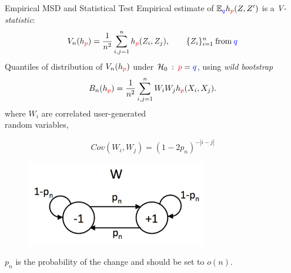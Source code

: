 \begin{frame}
\begin{columns}
\begin{column}{.33\linewidth}
\vspace{-0.75cm}
\begin{block}{Empirical MSD and Statistical Test}
Empirical estimate  of $\mathbb{E}_{\color{blue} q} h_{\color{red} p}(Z,Z')$ is
a {\em V-statistic}: 
\[
 V_n(h_{\color{red} p}) = \frac {1} {n^2} \sum_{i,j=1}^n h_{\color{red} p}(Z_i,Z_j),
 \qquad
 \{ Z_i \}_{i=1}^{n} \:\mathrm{from}\: {\color{blue} q}
\]
Quantiles of distribution of $ V_n(h_{\color{red} p})$ under $\mathcal{H}_0\::\:{\color{red} p}={\color{blue}q}$,  using {\em wild bootstrap}
\[
 B_n(h_{\color{red} p}) = \frac {1} {n^2} \sum_{i,j=1}^n W_i W_j h_{\color{red} p}(X_i,X_j).
\]
  where $W_i$ are correlated user-generated\\ random variables,
  \vspace{-1.3cm}
\begin{center}
  \begin{minipage}{.49\linewidth}
       $$
  Cov(W_i,W_j) = (1-2p_n)^{-|i-j|}
  $$
\end{minipage}
\begin{minipage}{.49\linewidth}
 \begin{figure}
            \vspace{-0.5cm}
           \includegraphics[width=0.7\textwidth, angle =0 ]{../../presentation/img/W_graphicalModel.pdf} 
        \end{figure}
\end{minipage}
\end{center}
  $p_n$ is  the probability of the change  and should be set to $o(n)$.

\begin{center}


\end{center}
\end{block}
\end{column}
\end{columns}
\end{frame}
